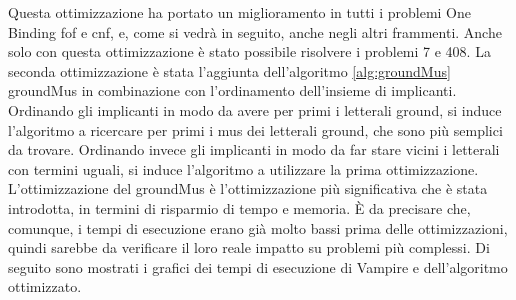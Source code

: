\documentclass[./main.tex]{subfiles}
\begin{document}
Questa ottimizzazione ha portato un miglioramento in tutti i problemi One Binding fof e cnf, e, come si vedrà in seguito, 
anche negli altri frammenti. 
Anche solo con questa ottimizzazione è stato possibile risolvere i problemi 7 e 408.
La seconda ottimizzazione è stata l'aggiunta dell'algoritmo \ref{alg:groundMus} groundMus 
in combinazione con l'ordinamento dell'insieme di implicanti.
Ordinando gli implicanti in modo da avere per primi i letterali ground, si induce l'algoritmo a ricercare per 
primi i mus dei letterali ground, che sono più semplici da trovare.
Ordinando invece gli implicanti in modo da far stare vicini i letterali con termini uguali, si induce 
l'algoritmo a utilizzare la prima ottimizzazione.
L'ottimizzazione del groundMus è l'ottimizzazione più significativa che è stata introdotta, in termini di risparmio di tempo e memoria.
È da precisare che, comunque, i tempi di esecuzione erano già molto bassi prima delle ottimizzazioni,
quindi sarebbe da verificare il loro reale impatto su problemi più complessi.
Di seguito sono mostrati i grafici dei tempi di esecuzione di Vampire e dell'algoritmo ottimizzato.


\end{document}
